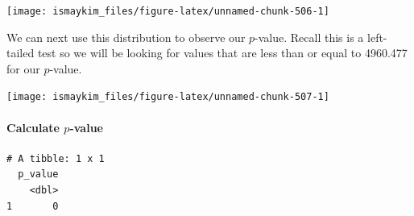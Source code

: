 \documentclass[12pt,]{krantz}
\makeatletter
\newenvironment{Shaded}{\begin{snugshade}}{\end{snugshade}}
\newcommand{\KeywordTok}[1]{\textcolor[rgb]{0.27,0.27,0.27}{\textbf{#1}}}
\newcommand{\DataTypeTok}[1]{\textcolor[rgb]{0.27,0.27,0.27}{#1}}
\newcommand{\StringTok}[1]{\textcolor[rgb]{0.5,0.5,0.5}{#1}}
\newcommand{\OperatorTok}[1]{\textcolor[rgb]{0.43,0.43,0.43}{\textbf{#1}}}
\newcommand{\NormalTok}[1]{#1}
\let\oldparagraph\paragraph
\renewcommand{\paragraph}[1]{\oldparagraph{#1}\mbox{}}
\newenvironment{kframe}{%
\medskip{}
\setlength{\fboxsep}{.8em}
 \def\at@end@of@kframe{}%
 \ifinner\ifhmode%
  \def\at@end@of@kframe{\end{minipage}}%
  \begin{minipage}{\columnwidth}%
 \fi\fi%
 \def\FrameCommand##1{\hskip\@totalleftmargin \hskip-\fboxsep
 \colorbox{shadecolor}{##1}\hskip-\fboxsep
     \hskip-\linewidth \hskip-\@totalleftmargin \hskip\columnwidth}%
 \MakeFramed {\advance\hsize-\width
   \@totalleftmargin\z@ \linewidth\hsize
   \@setminipage}}%
 {\par\unskip\endMakeFramed%
 \at@end@of@kframe}
\renewenvironment{Shaded}{\begin{kframe}}{\end{kframe}}
\theoremstyle{definition}
\theoremstyle{definition}
\theoremstyle{definition}
\theoremstyle{remark}
\makeatother
\begin{document}
\begin{Shaded}
\end{Shaded}

\begin{center}\texttt{[image: ismaykim\_files/figure-latex/unnamed-chunk-506-1]} \end{center}

We can next use this distribution to observe our \(p\)-value. Recall
this is a left-tailed test so we will be looking for values that are
less than or equal to 4960.477 for our \(p\)-value.

\begin{Shaded}
\end{Shaded}

\begin{center}\texttt{[image: ismaykim\_files/figure-latex/unnamed-chunk-507-1]} \end{center}

\paragraph{\texorpdfstring{Calculate
\(p\)-value}{Calculate p-value}}\label{calculate-p-value-4}

\begin{Shaded}
\end{Shaded}

\begin{verbatim}
# A tibble: 1 x 1
  p_value
    <dbl>
1       0
\end{verbatim}
\end{document}
